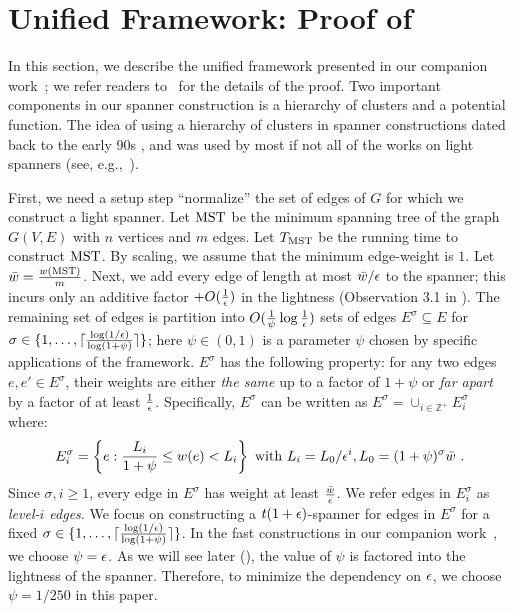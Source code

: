 
\section{Unified Framework: Proof of }\label{sec:framework}


In this section, we describe the unified framework presented in our companion work~\cite{LS21}; we refer readers to~\cite{LS21} for the details of the proof.   Two important components in our spanner construction is a hierarchy of clusters and a potential function. The idea of using a hierarchy of clusters in spanner constructions dated back to the early 90s \cite{ALGP89,CDNS92}, and was used by most if not all of the works on light spanners (see, e.g.,~\cite{ES16,ENS14,CW16,BLW17,BLW19,LS19}).
  

First, we need a setup step ``normalize'' the set of edges of $G$ for which we construct a light spanner. Let $\operatorname{\mathrm{MST}}$ be the minimum spanning tree of the graph $G(V,E)$ with $n$ vertices and $m$ edges. Let $T_{\operatorname{\mathrm{MST}}}$ be the running time to construct $\operatorname{\mathrm{MST}}$. By scaling, we assume that the minimum edge-weight is $1$. Let $\bar{w} = \frac{w(\mathrm{MST})}{m}$. Next, we add every edge of length at most $\bar{w}/\epsilon$ to the spanner; this incurs only an additive factor $+O(\frac{1}{\epsilon})$ in the lightness (Observation 3.1 in \cite{LS21}). The remaining set of edges is partition into $O(\frac{1}{\psi}\log\frac{1}{\epsilon})$ sets of edges $E^{\sigma} \subseteq E$ for $\sigma \in \{1,\ldots, \lceil \frac{\log(1/\epsilon)}{\log(1+\psi)} \rceil\}$; here  $\psi \in (0,1)$ is a parameter $\psi$ chosen by specific applications of the framework.  $E^{\sigma}$ has the following property: for any two edges $e, e' \in E^{\sigma}$, their weights are either \emph{the same} up to a factor of $1+\psi$ or \emph{far apart} by a factor of at least $\frac{1}{\epsilon}$. Specifically, $E^{\sigma}$ can be written as $E^{\sigma} = \cup_{i\in \mathbb{Z}^+} E^{\sigma}_i$ where:
\begin{equation}\label{eq:Esigmai}
	E^{\sigma}_i = \left\{e : \frac{L_i}{1+\psi} \leq w(e) < L_i \right\} \mbox{ with } L_i = L_{0}/\epsilon^i, L_0 = (1+\psi)^{\sigma}\bar{w}~. 
\end{equation}
Since $\sigma,i \geq 1$, every edge in $E^{\sigma}$ has weight at least $\frac{\bar{w}}{\epsilon}$. We refer edges in $E^{\sigma}_i$ as \emph{level-$i$ edges}. We focus on constructing a $t(1+\epsilon)$-spanner for edges in $E^{\sigma}$ for a fixed $\sigma \in \{1,\ldots, \lceil \frac{\log(1/\epsilon)}{\log(1+\psi)} \rceil\}$. In the fast constructions in our companion work~\cite{LS21}, we choose $\psi = \epsilon$. As we will see later (), the value of $\psi$ is factored into the lightness of the spanner. Therefore, to minimize the dependency on $\epsilon$, we choose $\psi = 1/250$ in this paper.  


